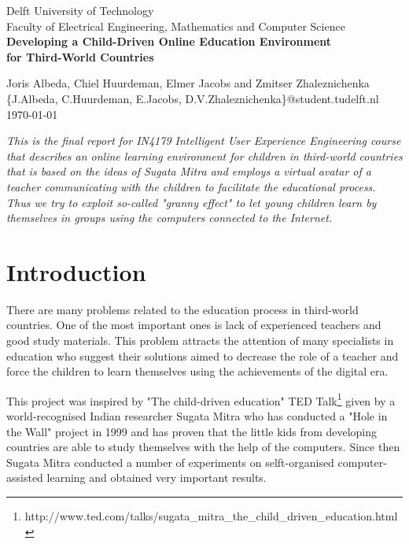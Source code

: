 \documentclass[a4paper]{article}
\begin{document}
\begin{titlepage}

\begin{center}

Delft University of Technology\\
Faculty of Electrical Engineering, Mathematics and Computer Science\\[3cm]
\large \bf{Developing a Child-Driven Online Education Environment \\ for Third-World Countries}\\[14cm]
\end{center}

\large \noindent 
Joris Albeda, Chiel Huurdeman, Elmer Jacobs and Zmitser Zhaleznichenka\\
\{J.Albeda, C.Huurdeman, E.Jacobs, D.V.Zhaleznichenka\}@student.tudelft.nl\\

\noindent\today

\end{titlepage}

\setcounter{secnumdepth}{3}

\abstract \emph{This is the final report for IN4179 Intelligent User Experience Engineering course that describes an online learning environment for children in third-world countries that is based on the ideas of Sugata Mitra and employs a virtual avatar of a teacher communicating with the children to facilitate the educational process. Thus we try to exploit so-called "granny effect" to let young children learn by themselves in groups using the computers connected to the Internet.}

\section{Introduction}

There are many problems related to the education process in third-world countries. One of the most important ones is lack of experienced teachers and good study materials. This problem attracts the attention of many specialists in education who suggest their solutions aimed to decrease the role of a teacher and force the children to learn themselves using the achievements of the digital era.

This project was inspired by "The child-driven education" TED Talk\footnote{http://www.ted.com/talks/sugata\_mitra\_the\_child\_driven\_education.html} given by a world-recognised Indian researcher Sugata Mitra who has conducted a "Hole in the Wall" project in 1999 and has proven that the little kids from developing countries are able to study themselves with the help of the computers. Since then Sugata Mitra conducted a number of experiments on selft-organised computer-assisted learning and obtained very important results. 
\end{document}
